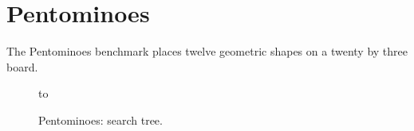 \section{Pentominoes} %
\label{pent_benchmark}

The Pentominoes benchmark places twelve geometric shapes on a twenty by three board.

\begin{figure}[htb]
\vspace{5mm} \hbox to 
\caption{Pentominoes: search tree.}
\vspace{5mm}
\label{pent_tree}
\end{figure}

